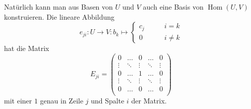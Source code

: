 Natürlich kann man aus Basen von $U$ und $V$ auch eine Basis von
$\operatorname{Hom}(U,V)$ konstruieren.
Die lineare Abbildung
\[
e_{ji}\colon U\to V:
b_k\mapsto \begin{cases}
c_j&\qquad i=k\\
0&\qquad i\ne k
\end{cases}
\]
hat die Matrix
\[
E_{ji}
=
\begin{pmatrix}
0     &\dots &0     &\dots &0     \\
\vdots&\ddots&\vdots&\ddots&\vdots\\
0     &\dots &1     &\dots &0     \\
\vdots&\ddots&\vdots&\ddots&\vdots\\
0     &\dots &0     &\dots &0     \\
\end{pmatrix}
\]
mit einer $1$ genau in Zeile $j$ und Spalte $i$ der Matrix.



